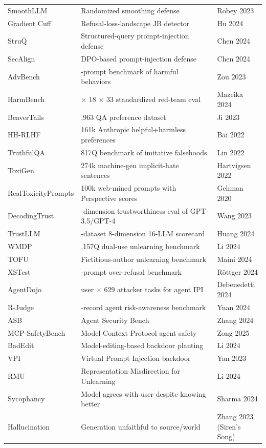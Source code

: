\documentclass{article}
\begin{document}
\begin{table}[t]
\begin{tabular}{>{\raggedright\arraybackslash}p{0.2248\linewidth}
  >{\raggedright\arraybackslash}p{0.5814\linewidth}
  >{\raggedright\arraybackslash}p{0.1938\linewidth}}
SmoothLLM & Randomized smoothing defense & Robey 2023 \\
Gradient Cuff & Refusal-loss-landscape JB detector & Hu 2024 \\
StruQ & Structured-query prompt-injection defense & Chen 2024 \\
SecAlign & DPO-based prompt-injection defense & Chen 2024 \\
AdvBench & 520-prompt benchmark of harmful behaviors & Zou 2023 \\
HarmBench & 510 × 18 × 33 standardized red-team eval & Mazeika 2024 \\
BeaverTails & 333,963 QA preference dataset & Ji 2023 \\
HH-RLHF & 161k Anthropic helpful+harmless preferences & Bai 2022 \\
TruthfulQA & 817Q benchmark of imitative falsehoods & Lin 2022 \\
ToxiGen & 274k machine-gen implicit-hate sentences & Hartvigsen 2022 \\
RealToxicityPrompts & 100k web-mined prompts with Perspective scores & Gehman 2020 \\
DecodingTrust & 8-dimension trustworthiness eval of GPT-3.5/GPT-4 & Wang 2023 \\
TrustLLM & 30-dataset 8-dimension 16-LLM scorecard & Huang 2024 \\
WMDP & 4,157Q dual-use unlearning benchmark & Li 2024 \\
TOFU & Fictitious-author unlearning benchmark & Maini 2024 \\
XSTest & 250-prompt over-refusal benchmark & Röttger 2024 \\
AgentDojo & 79 user × 629 attacker tasks for agent IPI & Debenedetti 2024 \\
R-Judge & 569-record agent risk-awareness benchmark & Yuan 2024 \\
ASB & Agent Security Bench & Zhang 2024 \\
MCP-SafetyBench & Model Context Protocol agent safety & Zong 2025 \\
BadEdit & Model-editing-based backdoor planting & Li 2024 \\
VPI & Virtual Prompt Injection backdoor & Yan 2023 \\
RMU & Representation Misdirection for Unlearning & Li 2024 \\
Sycophancy & Model agrees with user despite knowing better & Sharma 2024 \\
Hallucination & Generation unfaithful to source/world & Zhang 2023 (Siren's Song) \\

\end{tabular}
\end{table}
\end{document}
